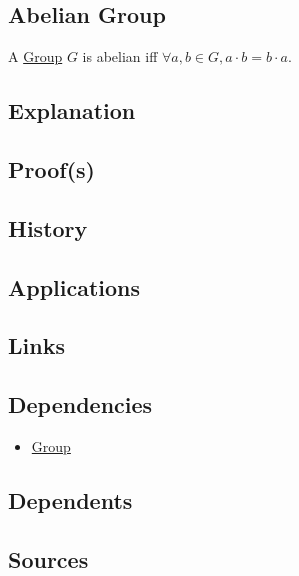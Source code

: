\subsection{Abelian Group}\label{articles:algebra:group-theory:abelian-group}
A \hyperref[articles:algebra:group-theory:group]{Group} $G$ is abelian iff $\forall a, b \in G, a \cdot b = b \cdot a$.

\subsection{Explanation}

\subsection{Proof(s)}

\subsection{History}

\subsection{Applications}

\subsection{Links}
\subsection{Dependencies}
\begin{itemize}
\item \hyperref[articles:algebra:group-theory:group]{Group}
\end{itemize}
\subsection{Dependents}

\subsection{Sources}
